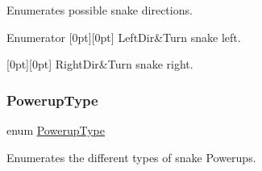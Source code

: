 Enumerates possible snake directions. 

\begin{DoxyEnumFields}{Enumerator}
[0pt][0pt]{}\mbox{\label{group__snake_gga224b9163917ac32fc95a60d8c1eec3aaa12e40bb84506b93d50f9f558c95dc3bd}} 
Left\+Dir&Turn snake left. \\
\hline

[0pt][0pt]{}\mbox{\label{group__snake_gga224b9163917ac32fc95a60d8c1eec3aaa789bd7cb240705a25bad56276fe01fff}} 
Right\+Dir&Turn snake right. \\
\hline

\end{DoxyEnumFields}
\mbox{\label{group__snake_gad58f93a5af4c0698fd0b903516c57c31}} 
\subsubsection{\texorpdfstring{Powerup\+Type}{PowerupType}}
{\footnotesize\ttfamily enum \mbox{\hyperlink{group__snake_gad58f93a5af4c0698fd0b903516c57c31}{Powerup\+Type}}}



Enumerates the different types of snake Powerups. 

